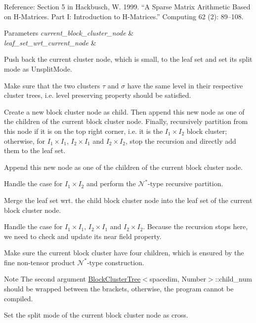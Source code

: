 Reference\+: Section 5 in Hackbusch, W. 1999. “A Sparse Matrix Arithmetic Based on H-\/\+Matrices. Part I\+: Introduction to H-\/\+Matrices.” Computing 62 (2)\+: 89–108. 
\begin{DoxyParams}{Parameters}
{\em current\+\_\+block\+\_\+cluster\+\_\+node} & \\
\hline
{\em leaf\+\_\+set\+\_\+wrt\+\_\+current\+\_\+node} & \\
\hline
\end{DoxyParams}
Push back the current cluster node, which is small, to the leaf set and set its split mode as {\ttfamily Unsplit\+Mode}.

Make sure that the two clusters $\tau$ and $\sigma$ have the same level in their respective cluster trees, i.\+e. level preserving property should be satisfied.

Create a new block cluster node as child. Then append this new node as one of the children of the current block cluster node. Finally, recursively partition from this node if it is on the top right corner, i.\+e. it is the $I_1 \times I_2$ block cluster; otherwise, for $I_1 \times I_1$, $I_2 \times I_1$ and $I_2 \times I_2$, stop the recursion and directly add them to the leaf set.

Append this new node as one of the children of the current block cluster node.

Handle the case for $I_1 \times I_2$ and perform the $\mathcal{N}^*$-\/type recursive partition.

Merge the leaf set wrt. the child block cluster node into the leaf set of the current block cluster node.

Handle the case for $I_1 \times I_1$, $I_2 \times I_1$ and $I_2 \times I_2$. Because the recursion stops here, we need to check and update its near field property.

Make sure the current block cluster have four children, which is ensured by the fine non-\/tensor product $\mathcal{N}^*$-\/type construction.


\begin{DoxyDescription}
\item[Note ]The second argument {\ttfamily \hyperlink{classBlockClusterTree}{Block\+Cluster\+Tree}$<$spacedim}, Number$>$\+::child\+\_\+num should be wrapped between the brackets, otherwise, the program cannot be compiled. 
\end{DoxyDescription}

Set the split mode of the current block cluster node as cross.


